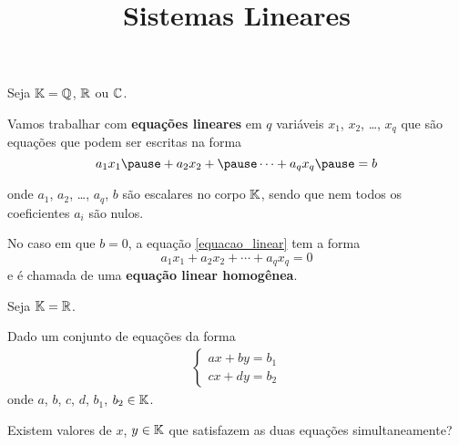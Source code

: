 \documentclass{beamer}
\title{Sistemas Lineares}
\author[\autor]{\autor}
\institute[\instituto]{\instituto}
\date{}
\begin{document}
    \begin{frame}
        \maketitle
    \end{frame}


    \begin{frame}
        Seja $\mathbb{K} = \mathbb{Q}$, $\mathbb{R}$ ou $\mathbb{C}$.\pause

        \vspace{.3cm}

        Vamos trabalhar com \textbf{equações lineares} \pause em $q$ variáveis $x_1$, $x_2$, \dots, $x_q$ \pause que são equações que podem ser escritas na forma
        \begin{equation}\label{equacao_linear}
            a_1x_1 \pause + a_2x_2 + \pause \cdots + a_qx_q \pause = b
        \end{equation}

        onde $a_1$, $a_2$, \dots, $a_q$, \pause $b$ são escalares no corpo $\mathbb{K}$, \pause sendo que nem todos os coeficientes $a_i$ são nulos.
        
        \vspace{.3cm}

        No caso em que $b = 0$, a equação \eqref{equacao_linear} tem a forma
        \begin{equation}
            a_1x_1 + a_2x_2 + \cdots + a_qx_q = 0
        \end{equation}
        e é chamada de uma \textbf{equação linear homogênea}.
        
    \end{frame}

    \begin{frame}
        Seja $\mathbb{K} = \mathbb{R}$.\pause

        \vspace{.3cm}
        
        Dado um conjunto de equações da forma
        \begin{align}
            \begin{cases}\label{sistema_linear_2x2}
                ax + by = b_1\\
                cx + dy = b_2
            \end{cases}
        \end{align}
        onde $a$, $b$, $c$, $d$, $b_1$, $b_2 \in \mathbb{K}$.\pause
    
        \vspace{.3cm}

        Existem valores de $x$, $y \in \mathbb{K}$ que satisfazem as duas equações simultaneamente?
    \end{frame}
    
\end{document}
